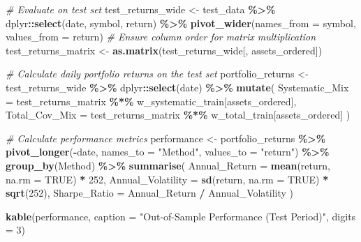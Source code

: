 \documentclass[
]{article}
\newenvironment{Shaded}{\begin{snugshade}}{\end{snugshade}}
\newcommand{\AttributeTok}[1]{\textcolor[rgb]{0.13,0.29,0.53}{#1}}
\newcommand{\CommentTok}[1]{\textcolor[rgb]{0.56,0.35,0.01}{\textit{#1}}}
\newcommand{\ConstantTok}[1]{\textcolor[rgb]{0.56,0.35,0.01}{#1}}
\newcommand{\DecValTok}[1]{\textcolor[rgb]{0.00,0.00,0.81}{#1}}
\newcommand{\FunctionTok}[1]{\textcolor[rgb]{0.13,0.29,0.53}{\textbf{#1}}}
\newcommand{\NormalTok}[1]{#1}
\newcommand{\OtherTok}[1]{\textcolor[rgb]{0.56,0.35,0.01}{#1}}
\newcommand{\SpecialCharTok}[1]{\textcolor[rgb]{0.81,0.36,0.00}{\textbf{#1}}}
\newcommand{\StringTok}[1]{\textcolor[rgb]{0.31,0.60,0.02}{#1}}
\begin{document}
\begin{Shaded}
\begin{Highlighting}[]
\CommentTok{\# Evaluate on test set}
\NormalTok{test\_returns\_wide }\OtherTok{\textless{}{-}}\NormalTok{ test\_data }\SpecialCharTok{\%\textgreater{}\%}
\NormalTok{  dplyr}\SpecialCharTok{::}\FunctionTok{select}\NormalTok{(date, symbol, return) }\SpecialCharTok{\%\textgreater{}\%}
  \FunctionTok{pivot\_wider}\NormalTok{(}\AttributeTok{names\_from =}\NormalTok{ symbol, }\AttributeTok{values\_from =}\NormalTok{ return)}
\CommentTok{\# Ensure column order for matrix multiplication}
\NormalTok{test\_returns\_matrix }\OtherTok{\textless{}{-}} \FunctionTok{as.matrix}\NormalTok{(test\_returns\_wide[, assets\_ordered])}

\CommentTok{\# Calculate daily portfolio returns on the test set}
\NormalTok{portfolio\_returns }\OtherTok{\textless{}{-}}\NormalTok{ test\_returns\_wide }\SpecialCharTok{\%\textgreater{}\%}
\NormalTok{  dplyr}\SpecialCharTok{::}\FunctionTok{select}\NormalTok{(date) }\SpecialCharTok{\%\textgreater{}\%}
  \FunctionTok{mutate}\NormalTok{(}
    \AttributeTok{Systematic\_Mix =}\NormalTok{ test\_returns\_matrix }\SpecialCharTok{\%*\%}\NormalTok{ w\_systematic\_train[assets\_ordered],}
    \AttributeTok{Total\_Cov\_Mix =}\NormalTok{ test\_returns\_matrix }\SpecialCharTok{\%*\%}\NormalTok{ w\_total\_train[assets\_ordered]}
\NormalTok{  )}

\CommentTok{\# Calculate performance metrics}
\NormalTok{performance }\OtherTok{\textless{}{-}}\NormalTok{ portfolio\_returns }\SpecialCharTok{\%\textgreater{}\%}
  \FunctionTok{pivot\_longer}\NormalTok{(}\SpecialCharTok{{-}}\NormalTok{date, }\AttributeTok{names\_to =} \StringTok{"Method"}\NormalTok{, }\AttributeTok{values\_to =} \StringTok{"return"}\NormalTok{) }\SpecialCharTok{\%\textgreater{}\%}
  \FunctionTok{group\_by}\NormalTok{(Method) }\SpecialCharTok{\%\textgreater{}\%}
  \FunctionTok{summarise}\NormalTok{(}
    \AttributeTok{Annual\_Return =} \FunctionTok{mean}\NormalTok{(return, }\AttributeTok{na.rm =} \ConstantTok{TRUE}\NormalTok{) }\SpecialCharTok{*} \DecValTok{252}\NormalTok{,}
    \AttributeTok{Annual\_Volatility =} \FunctionTok{sd}\NormalTok{(return, }\AttributeTok{na.rm =} \ConstantTok{TRUE}\NormalTok{) }\SpecialCharTok{*} \FunctionTok{sqrt}\NormalTok{(}\DecValTok{252}\NormalTok{),}
    \AttributeTok{Sharpe\_Ratio =}\NormalTok{ Annual\_Return }\SpecialCharTok{/}\NormalTok{ Annual\_Volatility}
\NormalTok{  )}

\FunctionTok{kable}\NormalTok{(performance, }\AttributeTok{caption =} \StringTok{"Out{-}of{-}Sample Performance (Test Period)"}\NormalTok{, }\AttributeTok{digits =} \DecValTok{3}\NormalTok{)}
\end{Highlighting}
\end{Shaded}
\end{document}
